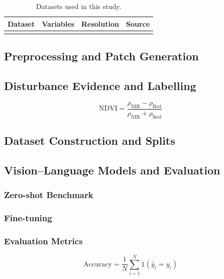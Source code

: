 \documentclass[12pt]{article}
\begin{document}
\begin{table}[H]
  \centering
  \caption{Datasets used in this study.}
  \label{tab:data}
  \begin{tabular}{llll}
    \toprule
    Dataset & Variables & Resolution & Source \\
    \midrule
     &  &  &  \\
    \bottomrule
  \end{tabular}
\end{table}

\subsection{Preprocessing and Patch Generation}

\subsection{Disturbance Evidence and Labelling}
\begin{equation}
  \mathrm{NDVI} = \frac{\rho_{\mathrm{NIR}} - \rho_{\mathrm{Red}}}{\rho_{\mathrm{NIR}} + \rho_{\mathrm{Red}}}
  \label{eq:ndvi}
\end{equation}

\subsection{Dataset Construction and Splits}

\subsection{Vision--Language Models and Evaluation}
\subsubsection{Zero-shot Benchmark}

\subsubsection{Fine-tuning}

\subsubsection{Evaluation Metrics}
\begin{equation}
  \mathrm{Accuracy} = \frac{1}{N}\sum_{i=1}^{N} \mathbb{1}\left(\hat{y}_i = y_i\right)
  \label{eq:acc}
\end{equation}
\end{document}
